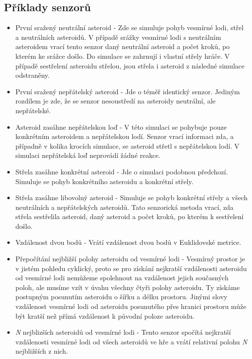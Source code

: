 \subsection{Příklady senzorů}
\begin{itemize}
    \item První sražený neutrální asteroid - Zde se simuluje pohyb vesmírné lodi, střel a neutrálních asteroidů. 
    V případě srážky vesmírné lodi s neutrálním asteroidem vrací tento senzor daný neutrální asteroid a počet kroků, po kterém ke srážce došlo.
    Do simulace se zahrnují i vlastní střely hráče. V případě sestřelení asteroidu střelou, jsou střela i asteroid z následné simulace odstraněny.    
    \item První sražený nepřátelský asteroid - Jde o téměř identický senzor. Jediným rozdílem je zde, že se senzor nesoustředí na asteroidy neutrální, ale nepřátelské.
    \item Asteroid zasáhne nepřátelskou loď - V této simulaci se pohybuje pouze konkrétním asteroidem a nepřátelskou lodí.
    Senzor vrací informaci zda, a případně v kolika krocích simulace, se asteroid střetl s nepřátelskou lodí.
    V simulaci nepřátelská loď neprovádí žádné reakce.
    \item Střela zasáhne konkrétní asteroid - Jde o simulaci podobnou předchozí. Simuluje se pohyb konkrétního asteroidu a konkrétní střely.
    \item Střela zasáhne libovolný asteroid - Simuluje se pohyb konkrétní střely a všech neutrálních a nepřátelských asteroidů.
        Tato senzorická metoda vrací, zda střela sestřelila asteroid, daný asteroid a počet kroků, po kterém k sestřelení došlo.
    \item Vzdálenost dvou bodů - Vrátí vzdálenost dvou bodů v Euklidovské metrice.
    \item Přepočítání nejbližší polohy asteroidu od vesmírné lodi - 
        Vesmírný prostor je v jistém pohledu cyklický, proto se pro získání nejkratší vzdálenosti asteroidu od vesmírné lodi nemůžeme spolehnout na vzdálenost jejich současných poloh, ale musíme vzít v úvahu všechny čtyři polohy asteroidu.
        Ty získáme postupným posunutím asteroidu o šířku a délku prostoru.
        Jinými slovy vzdálenost vesmírné lodi od asteroidu posunutého přes hranici prostoru může být kratší než přímá vzdálenost k původní poloze asteroidu.
    \item \emph{N} nejblizších asteroidů od vesmírné lodi - Tento senzor spočítá nejkratší vzdálenosti vesmírné lodi od všech asteroidů ve hře a vrátí relativní polohu \emph{N} nejbližších z nich.
    
\end{itemize}



